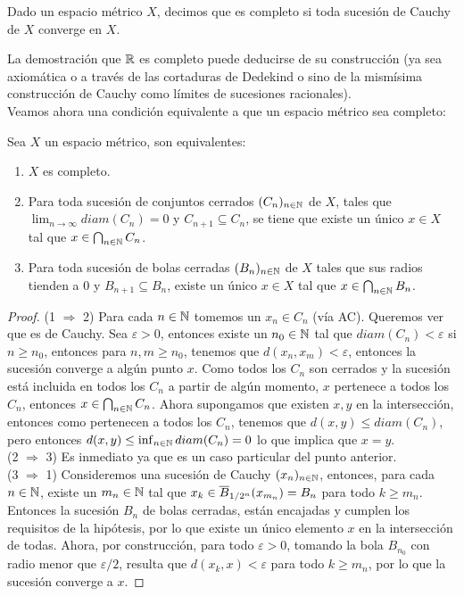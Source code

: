 \documentclass[12pt,a4paper]{book}
\begin{document}
\begin{defi}
Dado un espacio métrico $X$, decimos que es completo si toda sucesión de Cauchy de $X$ converge en $X$.
\end{defi}
La demostración que $\mathbb{R}$ es completo puede deducirse de su construcción (ya sea axiomática o a través de las cortaduras de Dedekind o sino de la mismísima construcción de Cauchy como límites de sucesiones racionales).\\[0.5cm]
Veamos ahora una condición equivalente a que un espacio métrico sea completo:
\begin{teo}
Sea $X$ un espacio métrico, son equivalentes:
\begin{enumerate}
\item $X$ es completo.
\item Para toda sucesión de conjuntos cerrados $(C_n)_{{n} \in \mathbb{N}}$ de $X$, tales que $\displaystyle \lim_{n \to \infty} diam(C_n)=0$ y $C_{n+1} \subseteq C_n$, se tiene que existe un único $x \in X$ tal que  $x \in \bigcap_{{n} \in \mathbb{N}} C_n$.
\item Para toda sucesión de bolas cerradas $(B_n)_{{n} \in \mathbb{N}}$ de $X$ tales que sus radios tienden a 0 y $B_{n+1} \subseteq B_n$, existe un único $x \in X$ tal que $x \in \bigcap_{{n} \in \mathbb{N}} B_n$.
\end{enumerate}
\begin{proof}
(1 $\Rightarrow$ 2) Para cada ${{n} \in \mathbb{N}}$ tomemos un $x_n \in C_n$ (vía AC). Queremos ver que es de Cauchy.
Sea $\varepsilon >0$, entonces existe un $n_0 \in \mathbb{N}$ tal que $diam(C_n)<\varepsilon$ si $n \geq n_0$, entonces para $n,m \geq n_0$, tenemos que $d(x_n,x_m)< \varepsilon$, entonces la sucesión converge a algún punto $x$. Como todos los  $C_n$ son cerrados y la sucesión está incluida en todos los $C_n$ a partir de algún momento, $x$ pertenece a todos los $C_n$, entonces $x \in \bigcap_{{n} \in \mathbb{N}} C_n$. Ahora supongamos que existen $x,y$ en la intersección, entonces como pertenecen a todos los $C_n$, tenemos que $d(x,y)\leq diam(C_n)$, pero entonces $d(x,y) \leq \inf_{{{n} \in \mathbb{N}}} diam(C_n) = 0$ lo que implica que $x=y$.\\
(2 $\Rightarrow$ 3) Es inmediato ya que es un caso particular del punto anterior.\\
(3 $\Rightarrow$ 1) Consideremos una sucesión de Cauchy $(x_n)_{{n} \in \mathbb{N}}$, entonces, para cada $n \in \mathbb{N}$, existe un $m_n \in \mathbb{N}$ tal que $x_k \in \overline{B}_{1/2^n}(x_{m_n})=B_n$ para todo $k \geq m_n$. Entonces la sucesión $B_n$ de bolas cerradas, están encajadas y cumplen los requisitos de la hipótesis, por lo que existe un único elemento $x$ en la intersección de todas. Ahora, por construcción, para todo $\varepsilon >0$, tomando la bola $B_{n_0}$ con radio menor que $\varepsilon/2$, resulta que $d(x_k,x) < \varepsilon$ para todo $k \geq m_n$, por lo que la sucesión converge a $x$.
\end{proof}
\end{teo}
\end{document}
